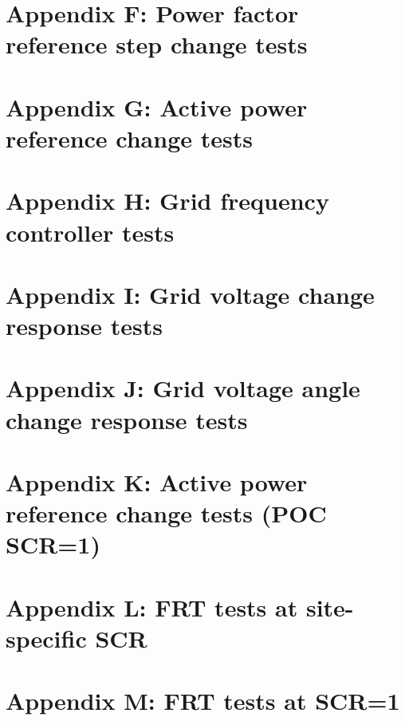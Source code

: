 \documentclass{../grid-link-report}
\begin{document}
	\section{Appendix F: Power factor reference step change tests}
	\label{Appendix F: Power factor reference step change tests}	
	\section{Appendix G: Active power reference change tests}
	\label{Appendix G: Active power reference change tests}
	\section{Appendix H: Grid frequency controller tests}
	\label{Appendix H: Grid frequency controller tests}
	\section{Appendix I: Grid voltage change response tests}
	\label{Appendix I: Grid voltage change response tests}
	\section{Appendix J: Grid voltage angle change response tests}
	\label{Appendix J: Grid voltage angle change response tests}
	\section{Appendix K: Active power reference change tests (POC SCR=1)}
	\label{Appendix K: Active power reference change tests (POC SCR=1)}
	\section{Appendix L: FRT tests at site-specific SCR}
	\label{Appendix L: FRT tests at site-specific SCR}
	\section{Appendix M: FRT tests at SCR=1}
	\label{Appendix M: FRT tests at SCR=1}

	
	
	
	
\end{document}
